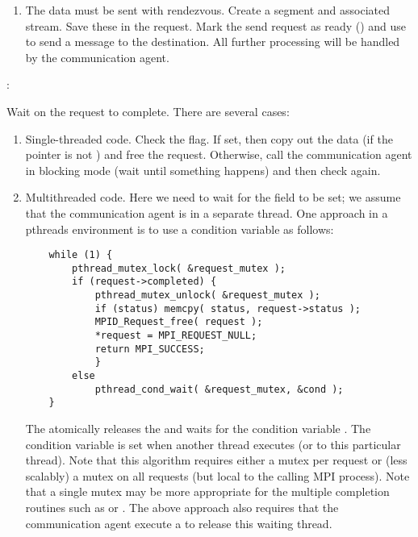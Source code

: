 \begin{mmadi}
\begin{tcp}
\begin{enumerate}
\item The data must be sent with rendezvous.
Create a segment and associated stream.  Save these in the request.
Mark the send request as ready () and use
 to send a  message to
the destination.  All further processing will be handled by the communication
agent. 
\end{enumerate}

:

Wait on the request to complete.  There are several cases:
\begin{enumerate}
\item Single-threaded code.  Check the  flag.
  If set, then copy out the  data (if the 
  pointer is not ) and free the request.  Otherwise, 
  call the communication agent in blocking mode (wait until something happens)
  and then check again.

\item Multithreaded code.  Here we need to wait for the
   field to be set; we assume that the
  communication agent is in a separate thread.  One approach in a pthreads
  environment is to use a 
  condition variable as follows:
\begin{verbatim}
    while (1) {
        pthread_mutex_lock( &request_mutex );
        if (request->completed) {
            pthread_mutex_unlock( &request_mutex );
            if (status) memcpy( status, request->status );
            MPID_Request_free( request );
            *request = MPI_REQUEST_NULL;
            return MPI_SUCCESS;
            }
        else 
            pthread_cond_wait( &request_mutex, &cond );
    }
\end{verbatim}  
The  atomically releases the  and
waits for the condition variable .  The condition variable is set
when another thread executes  (or
 to this particular thread).
Note that this algorithm requires either a mutex per request or (less
scalably) a mutex 
on all requests (but local to the calling MPI process).  
Note that a single mutex may be more appropriate for the multiple completion
routines such as  or .
The above approach also requires that the communication agent execute a
 to release this waiting thread.


\end{enumerate}
\end{tcp}
\end{mmadi}
